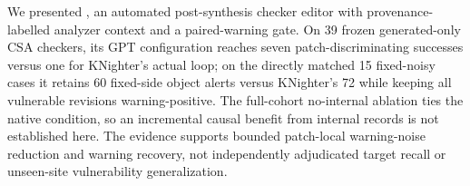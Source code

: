 We presented \toolname, an automated post-synthesis checker editor with provenance-labelled analyzer context and a paired-warning gate. On 39 frozen generated-only CSA checkers, its GPT configuration reaches seven patch-discriminating successes versus one for KNighter's actual loop; on the directly matched 15 fixed-noisy cases it retains 60 fixed-side object alerts versus KNighter's 72 while keeping all vulnerable revisions warning-positive. The full-cohort no-internal ablation ties the native condition, so an incremental causal benefit from internal records is not established here. The evidence supports bounded patch-local warning-noise reduction and warning recovery, not independently adjudicated target recall or unseen-site vulnerability generalization.
